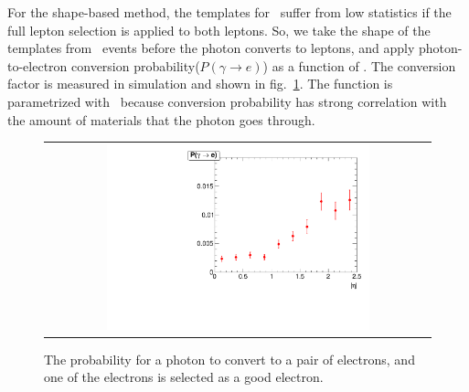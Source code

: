 For the shape-based method, the templates for \wgamma\ suffer from low statistics 
if the full lepton selection is applied to both leptons. So, we take the shape of the 
templates from \wgamma\ events before the photon converts to leptons, and apply 
photon-to-electron conversion probability($P(\gamma \rightarrow e)$) as a function of \Eta. 
The conversion 
factor is measured in simulation and shown in fig.~\ref{fig:photon_electron_ratio}.  
The function is parametrized with \Eta\ because conversion probability has strong 
correlation with the amount of materials that the photon goes through.
\begin{figure}[htp] 
\centering 
\begin{tabular}{c} 
\includegraphics[width=0.7\textwidth]{figures/ratio_photon_electron.pdf} 
\end{tabular} 
\caption{The probability for a photon to convert to a pair of electrons, 
and one of the electrons is selected as a good electron.  } 
\label{fig:photon_electron_ratio} 
\end{figure}  

